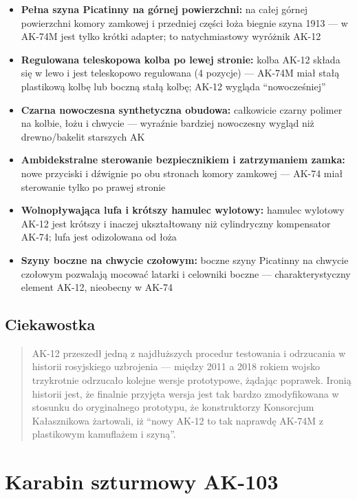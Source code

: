 \documentclass[12pt,oneside]{book}
\providecommand{\tightlist}{%
  \setlength{\itemsep}{0pt}\setlength{\parskip}{0pt}}
\begin{document}
\begin{itemize}
\tightlist
\item
  \textbf{Pełna szyna Picatinny na górnej powierzchni:} na całej górnej
  powierzchni komory zamkowej i przedniej części łoża biegnie szyna 1913
  --- w AK-74M jest tylko krótki adapter; to natychmiastowy wyróżnik
  AK-12
\item
  \textbf{Regulowana teleskopowa kolba po lewej stronie:} kolba AK-12
  składa się w lewo i jest teleskopowo regulowana (4 pozycje) --- AK-74M
  miał stałą plastikową kolbę lub boczną stałą kolbę; AK-12 wygląda
  ``nowocześniej''
\item
  \textbf{Czarna nowoczesna synthetyczna obudowa:} całkowicie czarny
  polimer na kolbie, łożu i chwycie --- wyraźnie bardziej nowoczesny
  wygląd niż drewno/bakelit starszych AK
\item
  \textbf{Ambidekstralne sterowanie bezpiecznikiem i zatrzymaniem
  zamka:} nowe przyciski i dźwignie po obu stronach komory zamkowej ---
  AK-74 miał sterowanie tylko po prawej stronie
\item
  \textbf{Wolnopływająca lufa i krótszy hamulec wylotowy:} hamulec
  wylotowy AK-12 jest krótszy i inaczej ukształtowany niż cylindryczny
  kompensator AK-74; lufa jest odizolowana od łoża
\item
  \textbf{Szyny boczne na chwycie czołowym:} boczne szyny Picatinny na
  chwycie czołowym pozwalają mocować latarki i celowniki boczne ---
  charakterystyczny element AK-12, nieobecny w AK-74
\end{itemize}

\subsection{Ciekawostka}\label{ciekawostka-62}

\begin{quote}
AK-12 przeszedł jedną z najdłuższych procedur testowania i odrzucania w
historii rosyjskiego uzbrojenia --- między 2011 a 2018 rokiem wojsko
trzykrotnie odrzucało kolejne wersje prototypowe, żądając poprawek.
Ironią historii jest, że finalnie przyjęta wersja jest tak bardzo
zmodyfikowana w stosunku do oryginalnego prototypu, że konstruktorzy
Konsorcjum Kałasznikowa żartowali, iż ``nowy AK-12 to tak naprawdę
AK-74M z plastikowym kamuflażem i szyną''.
\end{quote}

\section{Karabin szturmowy AK-103}\label{karabin-szturmowy-ak-103}
\end{document}
